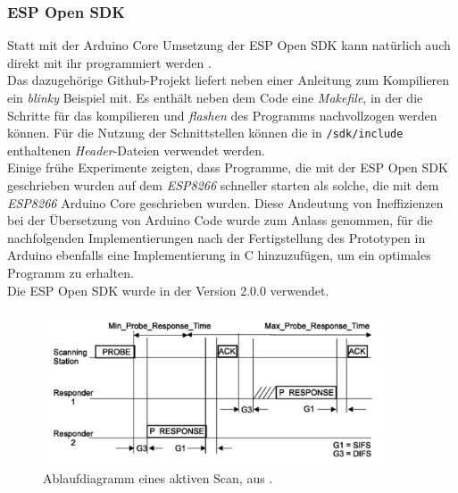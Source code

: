 \subsubsection{ESP Open SDK}
Statt mit der Arduino Core Umsetzung der ESP Open SDK kann natürlich auch direkt mit ihr programmiert werden \cite{esp2017open}. \\
Das dazugehörige Github-Projekt liefert neben einer Anleitung zum Kompilieren ein \textit{blinky} Beispiel mit.
Es enthält neben dem Code eine \emph{Makefile}, in der die Schritte für das kompilieren und \emph{flashen} des Programms nachvollzogen werden können.
Für die Nutzung der Schnittstellen können die in \texttt{/sdk/include} enthaltenen \emph{Header}-Dateien verwendet werden. \\
Einige frühe Experimente zeigten, dass Programme, die mit der ESP Open SDK geschrieben wurden auf dem \emph{ESP8266} schneller starten als solche, die mit dem \emph{ESP8266} Arduino Core geschrieben wurden.
Diese Andeutung von Ineffizienzen bei der Übersetzung von Arduino Code wurde zum Anlass genommen, für die nachfolgenden Implementierungen nach der Fertigstellung des Prototypen in Arduino ebenfalls eine Implementierung in C hinzuzufügen, um ein optimales Programm zu erhalten. \\
Die ESP Open SDK wurde in der Version 2.0.0 verwendet.

\begin{figure}[h]
  \centering
	\includegraphics[width=0.9\textwidth]{images/activescan.png}
  \caption{Ablaufdiagramm eines aktiven Scan, aus \cite{ieee2012active}.}
  \label{fig:activescan}
\end{figure}


